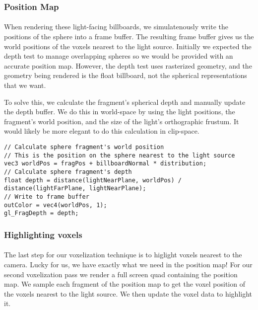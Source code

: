 \subsubsection{Position Map}\paragraph{}
When rendering these light-facing billboards, we simulatenously write the positions of the sphere into a frame buffer. 
The resulting frame buffer gives us the world positions of the voxels nearest to the light source. 
Initially we expected the depth test to manage overlapping spheres so we would be provided with an accurate position map. 
However, the depth test uses rasterized geometry, and the geometry being rendered is the float billboard, not the spherical representations that we want. 

To solve this, we calculate the fragment's spherical depth and manually update the depth buffer. We do this in world-space by using the light positions, the fragment's world position, and the size of the light's orthographic frustum. It would likely be more elegant to do this calculation in clip-space.
\begin{lstlisting}[caption={first\_voxelize.glsl, 60}]
// Calculate sphere fragment's world position 
// This is the position on the sphere nearest to the light source
vec3 worldPos = fragPos + billboardNormal * distribution;
// Calculate sphere fragment's depth
float depth = distance(lightNearPlane, worldPos) / distance(lightFarPlane, lightNearPlane);
// Write to frame buffer
outColor = vec4(worldPos, 1);
gl_FragDepth = depth;
\end{lstlisting}


\subsubsection{Highlighting voxels}\paragraph{}
The last step for our voxelization technique is to higlight voxels nearest to the camera. Lucky for us, we have exactly what we need in the position map! 
For our second voxelization pass we render a full screen quad containing the position map. We sample each fragment of the position map to get the voxel position of the voxels nearest to the light source. We then update the voxel data to highlight it. 


